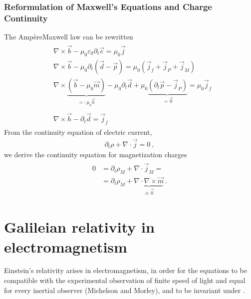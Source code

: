 \documentclass[letterpaper,10pt,english]{jupyterBook}
\begin{document}
\subsubsection{Reformulation of Maxwell’s Equations and Charge Continuity}
\label{\detokenize{ch/principles-matter-magnetization:reformulation-of-maxwell-s-equations-and-charge-continuity}}
\sphinxAtStartPar
The Ampère\sphinxhyphen{}Maxwell law can be rewritten
\begin{equation*}
\begin{split}\begin{aligned}
 & \nabla \times \vec{b} - \mu_0 \varepsilon_0 \partial_t \vec{e} = \mu_0 \vec{j} \\
 & \nabla \times \vec{b} - \mu_0 \partial_t \left( \vec{d} - \vec{p} \right) = \mu_0 \left( \vec{j}_f + \vec{j}_P + \vec{j}_M \right) \\
 & \nabla \times \underbrace{\left( \vec{b} - \mu_0 \vec{m} \right)}_{=: \mu_0 \vec{h}} - \mu_0 \partial_t \vec{d} + \mu_0 \underbrace{\left( \partial_t \vec{p} - \vec{j}_P \right)}_{= \vec{0}} = \mu_0 \vec{j}_f  \\ \\
 & \nabla \times \vec{h} - \partial_t \vec{d} = \vec{j}_f
\end{aligned}\end{split}
\end{equation*}
\sphinxAtStartPar
From the continuity equation of electric current,
\begin{equation*}
\begin{split}\partial_t \rho + \nabla \cdot \vec{j} = 0 \ ,\end{split}
\end{equation*}
\sphinxAtStartPar
we derive the continuity equation for magnetization charges
\begin{equation*}
\begin{split}\begin{aligned}
  0 & = \partial_t \rho_M + \nabla \cdot \vec{j}_M = \\
    & = \partial_t \rho_M + \underbrace{ \nabla \cdot \nabla \times \vec{m}}_{ \equiv \vec{0} } \ .
\end{aligned}\end{split}
\end{equation*}
\sphinxstepscope


\section{Galileian relativity in electromagnetism}
\label{\detokenize{ch/principles-relativity:galileian-relativity-in-electromagnetism}}\label{\detokenize{ch/principles-relativity:classical-electromagnetism-principles-low-speed-relativity}}\label{\detokenize{ch/principles-relativity::doc}}
\sphinxAtStartPar
Einstein’s relativity arises in electromagnetism, in order for the equations to be compatible with the experimental observation of finite speed of light and equal for every inertial observer (Michelson and Morley), and to be invariant under .
\end{document}
